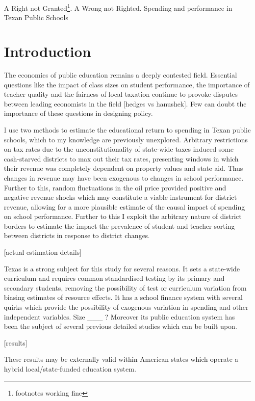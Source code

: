 \documentclass[11pt]{article}
\begin{document}
\setlength{\baselineskip}{0.3in} 

A Right not Granted\footnote{footnotes working fine}. A Wrong not Righted.
Spending and performance in Texan Public Schools

\section{Introduction}

The economics of public education remains a deeply contested field. Essential questions like the impact of class sizes on student performance, the importance of teacher quality and the fairness of local taxation continue to provoke disputes between leading economists in the field [hedges vs hanushek]. Few can doubt the importance of these questions in designing policy. 

I use two methods to estimate the educational return to spending in Texan public schools, which to my knowledge are previously unexplored. Arbitrary restrictions on tax rates due to the unconstitutionality of state-wide taxes induced some cash-starved districts to max out their tax rates, presenting windows in which their revenue was completely dependent on property values and state aid. Thus changes in revenue may have been exogenous to changes in school performance. Further to this, random fluctuations in the oil price provided positive and negative revenue shocks which may constitute a viable instrument for district revenue, allowing for a more plausible estimate of the causal impact of spending on school performance. Further to this I exploit the arbitrary nature of district borders to estimate the impact the prevalence of student and teacher sorting between districts in response to district changes.  

[actual estimation details]

Texas is a strong subject for this study for several reasons. It sets a state-wide curriculum and requires common standardised testing by its primary and secondary students, removing the possibility of test or curriculum variation from biasing estimates of resource effects. It has a school finance system with several quirks which provide the possibility of exogenous variation in spending and other independent variables. Size ___ ? Moreover its public education system has been the subject of several previous detailed studies which can be built upon. 

[results]

These results may be externally valid within American states which operate a hybrid local/state-funded education system. 
\end{document}
